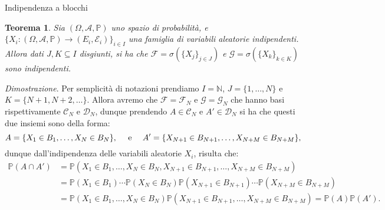 \documentclass[11pt]{book}
\makeatletter
\theoremstyle{Definizione}
\theoremstyle{TeoremaProposizioneLemmaCorollario}
\newtheorem{myteo}{Teorema}[section]
\theoremstyle{OsservazioneNota}
\renewenvironment{proof}[1][\proofname]{\par
  \normalfont \topsep6\p@\@plus6\p@\relax
  \trivlist
  \item[\hskip\labelsep
        \itshape
    #1\@addpunct{.}]\ignorespaces
}{%
  \endtrivlist\@endpefalse
}
\newcommand{\N}{\mathbb{N}}
\renewcommand{\P}{\mathbb{P}}
\renewenvironment{proof}{\textsl{Dimostrazione}.}{}
\makeatother
\begin{document}
\begin{boxteo}{Indipendenza a blocchi}
\begin{myteo}
Sia $(\Omega,\mathcal{A},\P)$ uno spazio di probabilità, e $\{X_i:(\Omega,\mathcal{A},\P)\longrightarrow (E_i,\mathcal{E}_i)\}_{i\in I}$ una famiglia di variabili aleatorie indipendenti. Allora dati $J,K\subseteq I$ disgiunti, si ha che $\mathcal{F} = \sigma(\{X_j\}_{j\in J})$ e $\mathcal{G}= \sigma(\{X_k\}_{k\in K})$ sono indipendenti.
\end{myteo}
\tcblower
\begin{proof}
Per semplicità di notazioni prendiamo $I = \N$, $J = \{1,\dots,N\}$ e $K = \{N+1,N+2,\dots\}$. Allora avremo che $\mathcal{F}= \mathcal{F}_N$ e $\mathcal{G}= \mathcal{G}_N$ che hanno basi rispettivamente $\mathcal{C}_N$ e $\mathcal{D}_N$, dunque prendendo $A\in\mathcal{C}_N$ e $A'\in \mathcal{D}_N$ si ha che questi due insiemi sono della forma:
$$
A = \{X_1\in B_1,\dots,X_N\in B_N\},\quad \textup{ e }\quad A' = \{X_{N+1}\in B_{N+1},\dots,X_{N+M}\in B_{N+M}\},
$$
dunque dall'indipendenza delle variabili aleatorie $X_i$, risulta che:
\begin{align*}
\P(A\cap A')&= \P(X_1\in B_1,\dots,X_N\in B_N,X_{N+1}\in B_{N+1},\dots,X_{N+M}\in B_{N+M})\\
&= \P(X_1\in B_1)\cdots\P(X_N\in B_N)\P(X_{N+1}\in B_{N+1})\cdots\P(X_{N+M}\in B_{N+M})\\
&= \P(X_1\in B_1,\dots,X_N\in B_N)\P(X_{N+1}\in B_{N+1},\dots,X_{N+M}\in B_{N+M}) = \P(A)\P(A').
\end{align*}
\end{proof}
\end{boxteo}
\end{document}
